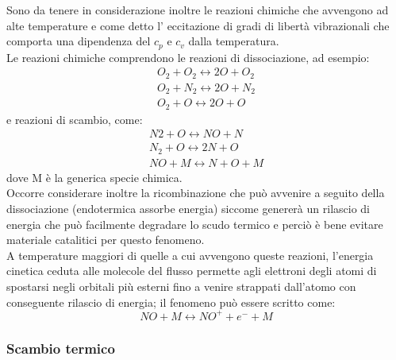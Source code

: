 \documentclass[10pt]{article}
\begin{document}
Sono da tenere in considerazione inoltre le reazioni chimiche che avvengono ad alte temperature e come detto l' eccitazione di gradi di libertà vibrazionali che comporta una dipendenza del $c_p$ e $c_v$ dalla temperatura.\\
Le reazioni chimiche comprendono le reazioni di dissociazione, ad esempio:
\begin{equation}
\begin{split}
    O_2 + O_2 \leftrightarrow 2O + O_2 \\
    O_2 + N_2 \leftrightarrow 2O + N_2 \\
    O_2 + O \leftrightarrow 2O + O 
\end{split}
\end{equation}
e reazioni di scambio, come:
\begin{equation}
  \begin{split}
    N2 + O \leftrightarrow NO + N\\
    N_2 + O \leftrightarrow 2N + O \\
    NO + M \leftrightarrow N + O + M
    \end{split}
\end{equation}
dove M è la generica specie chimica.\\
Occorre considerare inoltre la ricombinazione che può avvenire a seguito della dissociazione (endotermica \textrightarrow assorbe energia) siccome genererà un rilascio di energia che può facilmente degradare lo scudo termico e perciò è bene evitare materiale catalitici per questo fenomeno.\\
A temperature maggiori di quelle a cui avvengono queste reazioni, l'energia cinetica ceduta alle molecole del flusso permette agli elettroni degli atomi di spostarsi negli orbitali più esterni fino a venire strappati dall'atomo con conseguente rilascio di energia; il fenomeno può essere scritto come:
 \begin{equation}
     NO + M \leftrightarrow NO^+ + e^- + M
 \end{equation}

\subsubsection{Scambio termico}
\end{document}
